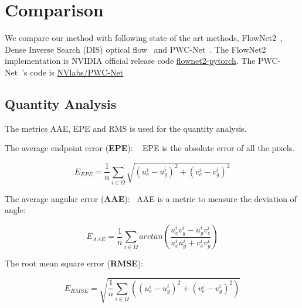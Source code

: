 \section{Comparison}

We compare our method with following state of the art methods, FlowNet2~\cite{ilg2017flownet}, Dense Inverse Search (DIS) optical flow~\cite{kroeger2016fast} and PWC-Net~\cite{sun2018pwc}. 
The FlowNet2~\cite{ilg2017flownet} implementation is NVIDIA official release code \href{https://github.com/NVIDIA/flownet2-pytorch}{flownet2-pytorch}.
The PWC-Net~\cite{sun2018pwc}'s code is \href{https://github.com/NVlabs/PWC-Net}{NVlabs/PWC-Net}

\subsection{Quantity Analysis}

The metrics AAE, EPE and RMS is used for the quantity analysis.

The average endpoint error (\textbf{EPE}):  ~\cite{??}
EPE is the absolute error of all the pixels. 

\begin{equation}\label{equ_exp_epe}
E_{EPE} = \frac{1}{n} \sum_{i \in \Omega}\sqrt{(u_e^i - u_g^i)^2 + (v_e^i - v_g^i)^2}
\end{equation}

The average angular error (\textbf{AAE}):~\cite{??}
AAE is a metric to measure the deviation of angle:

\begin{equation}\label{equ_exp_aae}
	E_{AAE} = \frac{1}{n} \sum_{i \in \Omega}arctan(\frac{u^i_e v^i_g - u^i_g v^i_e}{u^i_e u^i_g + v^i_e v^i_g})
\end{equation}

The root mean square error (\textbf{RMSE}):~\cite{??}

\begin{equation}\label{equ_exp_rmse}
	E_{RMSE} = \sqrt{\frac{1}{n} \sum_{i \in \Omega}((u_e^i - u_g^i)^2 + (v_e^i - v_g^i)^2)}
\end{equation}





